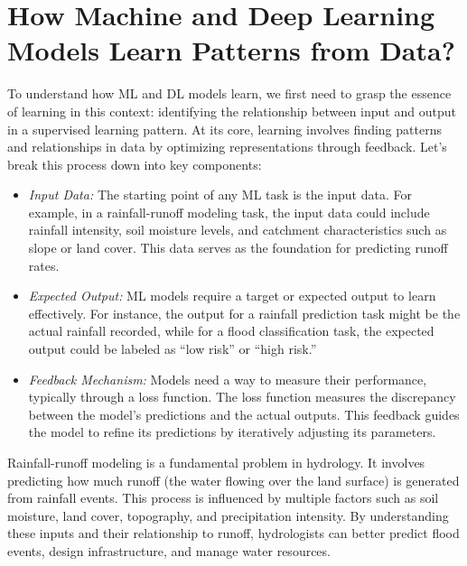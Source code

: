 \section{How Machine and Deep Learning Models Learn Patterns from Data?}
To understand how ML and DL models learn, we first need to grasp the essence of learning in this context: identifying the relationship between input and output in a supervised learning pattern. At its core, learning involves finding patterns and relationships in data by optimizing representations through feedback. Let’s break this process down into key components:

\begin{itemize} \item \textit{Input Data:} The starting point of any ML task is the input data. For example, in a rainfall-runoff modeling task, the input data could include rainfall intensity, soil moisture levels, and catchment characteristics such as slope or land cover. This data serves as the foundation for predicting runoff rates.

\item \textit{Expected Output:} ML models require a target or expected output to learn effectively. For instance, the output for a rainfall prediction task might be the actual rainfall recorded, while for a flood classification task, the expected output could be labeled as “low risk” or “high risk.”

\item \textit{Feedback Mechanism:} Models need a way to measure their performance, typically through a loss function. The loss function measures the discrepancy between the model’s predictions and the actual outputs. This feedback guides the model to refine its predictions by iteratively adjusting its parameters.
\end{itemize}

\begin{tcolorbox}[enhanced,
  watermark opacity=0.3,watermark zoom=0.9,
  colback=blue!5!white, colframe=blue!70!black,
  fonttitle=\bfseries, title=Rainfall-Runoff Modeling]
  Rainfall-runoff modeling is a fundamental problem in hydrology. It involves predicting how much runoff (the water flowing over the land surface) is generated from rainfall events. This process is influenced by multiple factors such as soil moisture, land cover, topography, and precipitation intensity. By understanding these inputs and their relationship to runoff, hydrologists can better predict flood events, design infrastructure, and manage water resources.
\end{tcolorbox}







